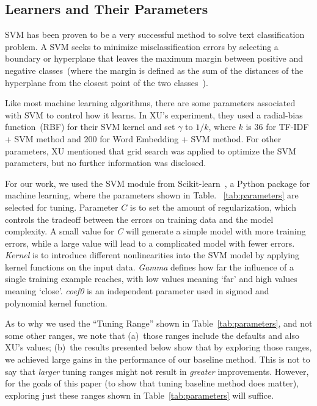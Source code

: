 \documentclass[sigconf]{acmart}
\theoremstyle{break}
\newcommand{\tab}[1]{Table~\ref{tab:#1}}
\begin{document}
\subsection{Learners and Their Parameters}
SVM has been proven to be a very successful method to solve
text classification problem. A SVM  seeks to minimize misclassification
errors by selecting a boundary or hyperplane that leaves
the maximum margin between positive and negative classes~(where the
margin is defined as the sum of the distances of the
hyperplane from the closest point of the two classes~\cite{joachims1998text}).

Like most machine learning algorithms, there are some parameters associated with
SVM to control how it learns.  In XU's experiment, they used a radial-bias function~(RBF) for their SVM kernel
and set $\gamma$ to $1/k$, where $k$ is $36$ for TF-IDF + SVM method
and $200$ for Word Embedding + SVM method. For other parameters, 
XU mentioned that grid search was applied to optimize the SVM parameters, 
but no further information was disclosed. 

For our work, we used the SVM module from Scikit-learn~\cite{scikit-learn}, a Python package for machine learning,
where the parameters shown in Table. ~\ref{tab:parameters} are selected for tuning.
Parameter $\mathit{C}$ is to set the amount of regularization, which controls the tradeoff between
the errors on training data and the model complexity.  A small value for {\it C} will generate 
a simple model with more training errors, while a large value will lead to a complicated model with fewer
errors. {\it Kernel} is to introduce different nonlinearities into the SVM model by applying kernel functions
on the input data. {\it Gamma } defines how far the influence of a single training example reaches, 
with low values meaning `far' and high values meaning `close'. {\it coef0} is an independent parameter used
in sigmod and  polynomial kernel function.

As to why we used the ``Tuning Range'' shown in \tab{parameters}, and not some other ranges,
we note that (a)~those ranges include the defaults and also XU's values; (b)~the results presented below
show that by exploring those ranges,  we achieved large gains in the performance of our baseline method.
This is not to say that {\em larger} tuning ranges might not result in {\em greater} improvements.
However, for the goals of this paper (to show that tuning baseline method does matter), exploring
just these ranges shown in \tab{parameters} will suffice.
\end{document}
